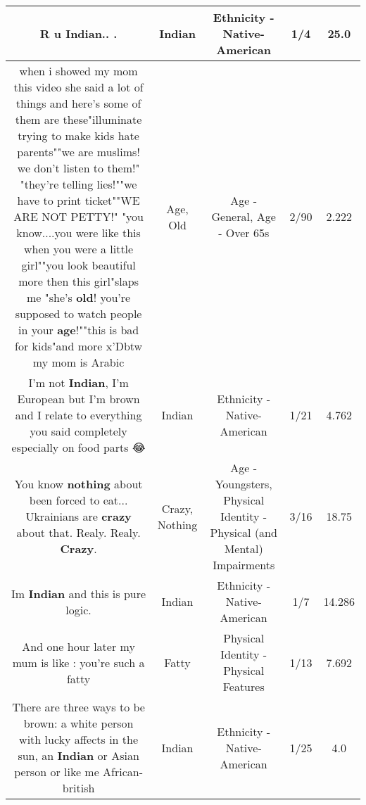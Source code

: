 \documentclass[11pt]{article}
\newlength\mylength
\begin{document}
\begin{center}
\begin{longtable}{|C{.65\mylength}|C{.30\mylength}|C{.12\mylength}|C{.12\mylength}|C{.12\mylength}|}
  \small R u \textbf{Indian}.. .\normalsize   & Indian & Ethnicity - Native-American & 1/4 & 25.0 \\  \hline
  \small when i showed my mom this video she said a lot of things and here's some of them are these"illuminate trying to make kids hate parents""we are muslims! we don't listen to them!" "they're telling lies!""we have to print ticket""WE ARE NOT PETTY!" "you know....you were like this when you were a little girl""you look beautiful more then this girl"slaps me "she's \textbf{old}! you're supposed to watch people in your \textbf{age}!""this is bad for kids"and more x'Dbtw my mom is Arabic\normalsize   & Age, Old & Age - General, Age - Over 65s & 2/90 & 2.222 \\  \hline
  \small I'm not \textbf{Indian}, I'm European but I'm brown and I relate to everything you said completely especially on food parts 😂\normalsize   & Indian & Ethnicity - Native-American & 1/21 & 4.762 \\  \hline
  \small You know \textbf{nothing} about been forced to eat... Ukrainians are \textbf{crazy} about that. Realy. Realy. \textbf{Crazy}.\normalsize   & Crazy, Nothing & Age - Youngsters, Physical Identity - Physical (and Mental) Impairments & 3/16 & 18.75 \\  \hline
  \small Im \textbf{Indian} and this is pure logic.\normalsize   & Indian & Ethnicity - Native-American & 1/7 & 14.286 \\  \hline
  \small And one hour later my mum is like : you're such a fatty\normalsize   & Fatty & Physical Identity - Physical Features & 1/13 & 7.692 \\  \hline
  \small There are three ways to be brown: a white person with lucky affects in the sun, an \textbf{Indian} or Asian person or like me African-british\normalsize   & Indian & Ethnicity - Native-American & 1/25 & 4.0 \\  \hline

\end{longtable}
\end{center}
\end{document}
